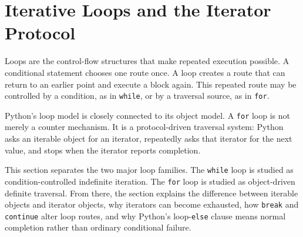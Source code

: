 \section{Iterative Loops and the Iterator Protocol}

Loops are the control-flow structures that make repeated execution possible. A conditional statement chooses one route once. A loop creates a route that can return to an earlier point and execute a block again. This repeated route may be controlled by a condition, as in \texttt{while}, or by a traversal source, as in \texttt{for}.

Python's loop model is closely connected to its object model. A \texttt{for} loop is not merely a counter mechanism. It is a protocol-driven traversal system: Python asks an iterable object for an iterator, repeatedly asks that iterator for the next value, and stops when the iterator reports completion.

This section separates the two major loop families. The \texttt{while} loop is studied as condition-controlled indefinite iteration. The \texttt{for} loop is studied as object-driven definite traversal. From there, the section explains the difference between iterable objects and iterator objects, why iterators can become exhausted, how \texttt{break} and \texttt{continue} alter loop routes, and why Python's loop-\texttt{else} clause means normal completion rather than ordinary conditional failure.